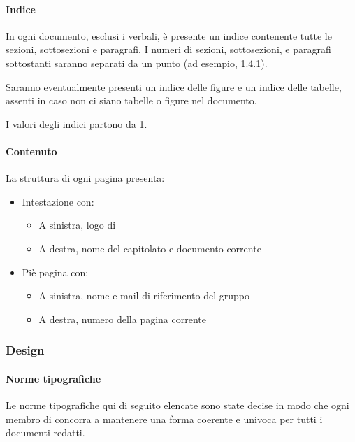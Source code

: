 			\paragraph{Indice}\label{PS:Documentazione:Struttura:Indice}
			In ogni documento, esclusi i verbali, è presente un indice contenente tutte le sezioni, sottosezioni e paragrafi. I numeri di sezioni, sottosezioni,
			e paragrafi sottostanti saranno separati da un punto (ad esempio, 1.4.1).\par
			Saranno eventualmente presenti un indice delle
			figure e un indice delle tabelle, assenti in caso non ci siano tabelle o figure nel documento.\par
			I valori degli indici partono da 1.

			\paragraph{Contenuto}\label{PS:Documentazione:Struttura:Contenuto}
			La struttura di ogni pagina presenta:
			\begin{itemize}
				\item Intestazione con:
				\begin{itemize}
					\item A sinistra, logo di \emph{\gruppo}
					\item A destra, nome del capitolato e documento corrente
				\end{itemize}
				\item Piè pagina con:
				\begin{itemize}
					\item A sinistra, nome e mail di riferimento del gruppo
					\item A destra, numero della pagina corrente
				\end{itemize}
			\end{itemize}


		\subsubsection{Design}\label{PS:Documentazione:Design}

			\paragraph{Norme tipografiche}\label{PS:Documentazione:Design:NormeT}
			Le norme tipografiche qui di seguito elencate sono state decise in modo che ogni membro di \gruppo concorra a mantenere una forma coerente e univoca
			per tutti i documenti redatti.

